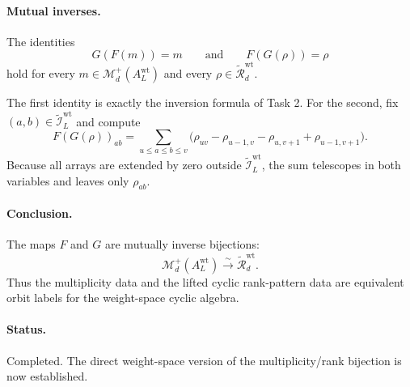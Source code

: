 \paragraph{Mutual inverses.}
The identities
\[
G(F(m))=m
\qquad\text{and}\qquad
F(G(\rho))=\rho
\]
hold for every \(m\in \mathcal M_d^+(A_L^{\mathrm{wt}})\) and every
\(\rho\in \widetilde{\mathcal R}_d^{\mathrm{wt}}\).

The first identity is exactly the inversion formula of Task 2. For the second,
fix \((a,b)\in \widetilde{\mathcal I}_L^{\mathrm{wt}}\) and compute
\[
F(G(\rho))_{ab}
=
\sum_{u\le a\le b\le v}
\bigl(
\rho_{uv}-\rho_{u-1,v}-\rho_{u,v+1}+\rho_{u-1,v+1}
\bigr).
\]
Because all arrays are extended by zero outside
\(\widetilde{\mathcal I}_L^{\mathrm{wt}}\), the sum telescopes in both
variables and leaves only \(\rho_{ab}\).

\paragraph{Conclusion.}
The maps \(F\) and \(G\) are mutually inverse bijections:
\[
\mathcal M_d^+(A_L^{\mathrm{wt}})
\xrightarrow{\sim}
\widetilde{\mathcal R}_d^{\mathrm{wt}}.
\]
Thus the multiplicity data and the lifted cyclic rank-pattern data are
equivalent orbit labels for the weight-space cyclic algebra.

\paragraph{Status.}
Completed. The direct weight-space version of the multiplicity/rank bijection is
now established.
